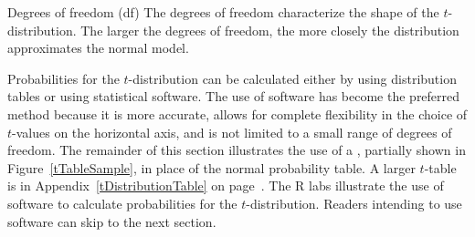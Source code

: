 \begin{onebox}{Degrees of freedom (df)}
The degrees of freedom characterize the shape of the $t$-distribution. The larger the degrees of freedom, the more closely the distribution approximates the normal model.
\end{onebox}

Probabilities for the $t$-distribution can be calculated either by using distribution tables or using statistical software. The use of software has become the preferred method because it is more accurate, allows for complete flexibility in the choice of $t$-values on the horizontal axis, and is not limited to a small range of degrees of freedom. The remainder of this section illustrates the use of a , partially shown in Figure~\ref{tTableSample}, in place of the normal probability table. A larger $t$-table is in Appendix~\ref{tDistributionTable} on page~\pageref{tDistributionTable}.  The \textsf{R} labs illustrate the use of software to calculate probabilities for the $t$-distribution.  Readers intending to use software can skip to the next section.


